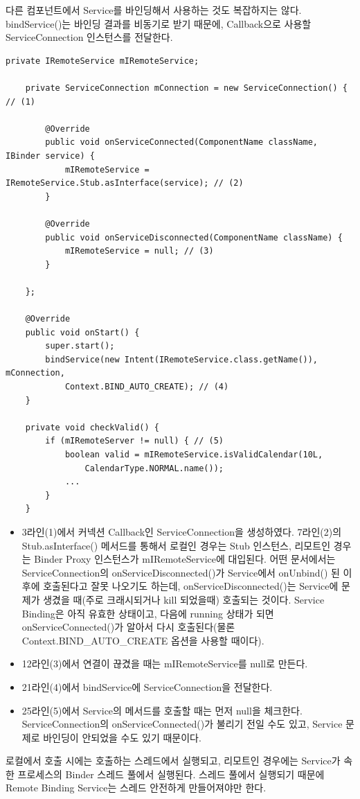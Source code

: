 다른 컴포넌트에서 Service를 바인딩해서 사용하는 것도 복잡하지는 않다. 
bindService()는 바인딩 결과를 비동기로 받기 때문에, Callback으로 사용할 ServiceConnection 인스턴스를 전달한다.
\begin{lstlisting}[frame=single]
	private IRemoteService mIRemoteService;

	private ServiceConnection mConnection = new ServiceConnection() { // (1)

		@Override
    	public void onServiceConnected(ComponentName className, IBinder service) {
        	mIRemoteService = IRemoteService.Stub.asInterface(service); // (2)
    	}

    	@Override
    	public void onServiceDisconnected(ComponentName className) {
        	mIRemoteService = null; // (3)
    	}
    	
	};

	@Override
	public void onStart() {
		super.start();
		bindService(new Intent(IRemoteService.class.getName()), mConnection,
			Context.BIND_AUTO_CREATE); // (4)
	}
	
	private void checkValid() {
		if (mIRemoteServer != null) { // (5)
			boolean valid = mIRemoteService.isValidCalendar(10L,
				CalendarType.NORMAL.name());
			...
		}	
	}
\end{lstlisting}
\begin{itemize}
\item 3라인(1)에서 커넥션 Callback인 ServiceConnection을 생성하였다. 7라인(2)의 Stub.asInterface() 메서드를 통해서 로컬인 경우는 Stub 인스턴스, 리모트인 경우는 Binder Proxy 인스턴스가 mIRemoteService에 대입된다.
어떤 문서에서는 ServiceConnection의 onServiceDisconnected()가 Service에서 onUnbind() 된 이후에 호출된다고 잘못 나오기도 하는데, onServiceDisconnected()는 Service에 문제가 생겼을 때(주로 크래시되거나 kill 되었을때) 호출되는 것이다.
Service Binding은 아직 유효한 상태이고, 다음에 running 상태가 되면 onServiceConnected()가 알아서 다시 호출된다(물론 Context.BIND\_AUTO\_CREATE 옵션을 사용할 때이다).
\item 12라인(3)에서 연결이 끊겼을 때는 mIRemoteService를 null로 만든다.
\item 21라인(4)에서 bindService에 ServiceConnection을 전달한다.
\item 25라인(5)에서 Service의 메서드를 호출할 때는 먼저 null을 체크한다. ServiceConnection의 onServiceConnected()가 불리기 전일 수도 있고, Service 문제로 바인딩이 안되었을 수도 있기 때문이다.
\end{itemize}

로컬에서 호출 시에는 호출하는 스레드에서 실행되고, 리모트인 경우에는 Service가 속한 프로세스의 Binder 스레드 풀에서 실행된다. 
스레드 풀에서 실행되기 때문에 Remote Binding Service는 스레드 안전하게 만들어져야만 한다.\\

